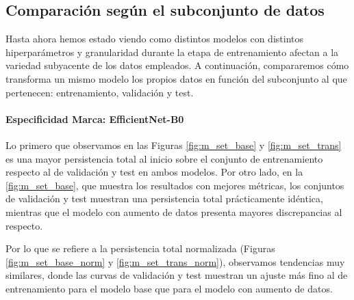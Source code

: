 \subsection{Comparación según el subconjunto de datos}
\label{subsec:set}

Hasta ahora hemos estado viendo como distintos modelos con distintos
hiperparámetros y granularidad durante la etapa de entrenamiento afectan a la
variedad subyacente de los datos empleados. A continuación, compararemos cómo
transforma un mismo modelo los propios datos en función del subconjunto al que
pertenecen: entrenamiento, validación y test.

\paragraph{Especificidad Marca: EfficientNet-B0}

Lo primero que observamos en las Figuras \ref{fig:m_set_base} y
\ref{fig:m_set_trans} es una mayor persistencia total al inicio sobre el
conjunto de entrenamiento respecto al de validación y test en ambos modelos. Por
otro lado, en la \autoref{fig:m_set_base}, que muestra los resultados con mejores
métricas, los conjuntos de validación y test muestran una persistencia total
prácticamente idéntica, mientras que el modelo con aumento de datos presenta mayores
discrepancias al respecto.

Por lo que se refiere a la persistencia total normalizada (Figuras
\ref{fig:m_set_base_norm} y \ref{fig:m_set_trans_norm}), observamos tendencias
muy similares, donde las curvas de validación y test muestran un ajuste más fino
al de entrenamiento para el modelo base que para el modelo con aumento de datos.

